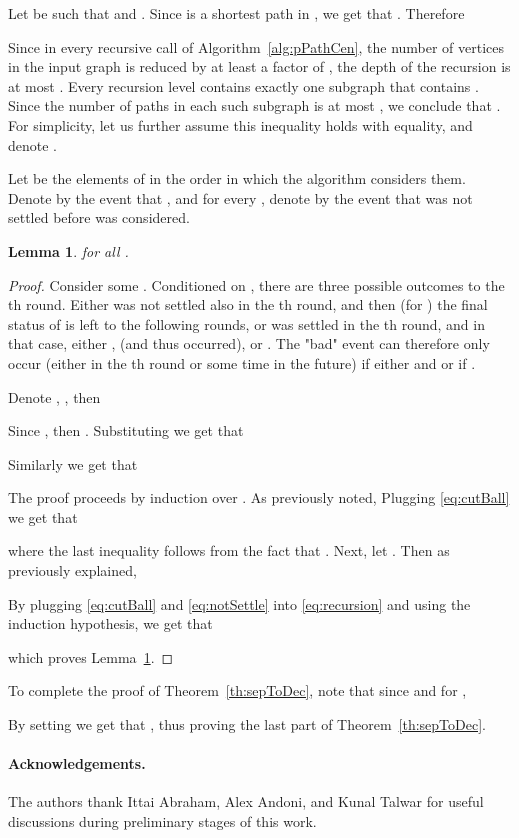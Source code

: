 \documentclass[11pt,fleqn]{article}
\newtheorem{lemma}[theorem]{Lemma}
\begin{document}
Let  be such that  and . Since  is a shortest path in , we get that . Therefore 

Since in every recursive call of Algorithm~\ref{alg:pPathCen}, the number of vertices in the input graph is reduced by at least a factor of , the depth of the recursion is at most .
Every recursion level contains exactly one subgraph that contains . Since the number of paths in each such subgraph is at most , we conclude that . For simplicity, let us further assume this inequality holds with equality, and denote .

Let  be the elements of  in the order in which the algorithm considers them.
Denote by  the event that , and for every , denote by  the event that  was not settled before  was considered.
\begin{lemma} \label{l:ind}
 for all .
\end{lemma}

\begin{proof}
Consider some . Conditioned on , there are three possible outcomes to the th round. Either  was not settled also in the th round, and then (for ) the final status of  is left to the following rounds, or  was settled in the th round, and in that case, either , (and thus  occurred), or .
The "bad" event  can therefore only occur (either in the th round or some time in the future) if either  and  or if .

Denote , , then 

Since , then . Substituting  we get that 

Similarly we get that 

The proof proceeds by induction over .
As previously noted,  Plugging \eqref{eq:cutBall} we get that

where the last inequality follows from the fact that . 
Next, let . Then as previously explained,

By plugging \eqref{eq:cutBall} and \eqref{eq:notSettle} into \eqref{eq:recursion} and using the induction hypothesis, we get that


which proves Lemma~\ref{l:ind}.
\end{proof}
To complete the proof of Theorem~\ref{th:sepToDec}, note that since  and for ,

By setting  we get that , thus proving the last part of Theorem~\ref{th:sepToDec}.



\paragraph{Acknowledgements.}
The authors thank Ittai Abraham, Alex Andoni, and Kunal Talwar for useful discussions during preliminary stages of this work.
\end{document}
